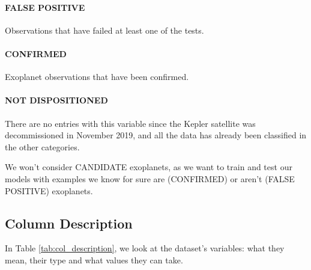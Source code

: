     \paragraph{FALSE POSITIVE} Observations that have failed at least one
    of the tests.
    
    \paragraph{CONFIRMED} Exoplanet observations that have been confirmed.
    
    \paragraph{NOT DISPOSITIONED} There are no entries with this variable since the Kepler satellite was decommissioned
    in November 2019, and all the data has already been classified in the other categories.
    
We won't  consider CANDIDATE exoplanets, as we want to train and test our models
with examples we know for sure are (CONFIRMED) or aren't (FALSE POSITIVE) 
exoplanets.

\subsection{Column Description}

In Table \ref{tab:col_description}, we look at the dataset's variables: what
they mean, their type and what values they can take.

\newcommand{\dd}{\textsuperscript{\ddag}}

